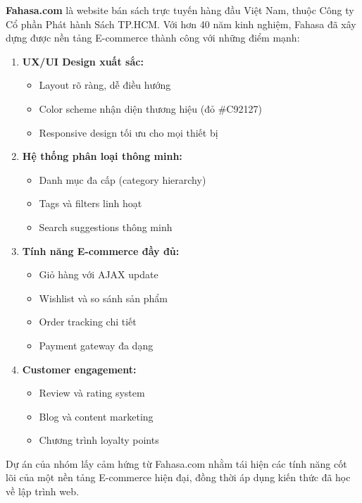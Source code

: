 \textbf{Fahasa.com} là website bán sách trực tuyến hàng đầu Việt Nam, thuộc Công ty Cổ phần Phát hành Sách TP.HCM. Với hơn 40 năm kinh nghiệm, Fahasa đã xây dựng được nền tảng E-commerce thành công với những điểm mạnh:

\begin{enumerate}
    \item \textbf{UX/UI Design xuất sắc:}
    \begin{itemize}
        \item Layout rõ ràng, dễ điều hướng
        \item Color scheme nhận diện thương hiệu (đỏ \#C92127)
        \item Responsive design tối ưu cho mọi thiết bị
    \end{itemize}

    \item \textbf{Hệ thống phân loại thông minh:}
    \begin{itemize}
        \item Danh mục đa cấp (category hierarchy)
        \item Tags và filters linh hoạt
        \item Search suggestions thông minh
    \end{itemize}

    \item \textbf{Tính năng E-commerce đầy đủ:}
    \begin{itemize}
        \item Giỏ hàng với AJAX update
        \item Wishlist và so sánh sản phẩm
        \item Order tracking chi tiết
        \item Payment gateway đa dạng
    \end{itemize}

    \item \textbf{Customer engagement:}
    \begin{itemize}
        \item Review và rating system
        \item Blog và content marketing
        \item Chương trình loyalty points
    \end{itemize}
\end{enumerate}

Dự án của nhóm lấy cảm hứng từ Fahasa.com nhằm tái hiện các tính năng cốt lõi của một nền tảng E-commerce hiện đại, đồng thời áp dụng kiến thức đã học về lập trình web.


